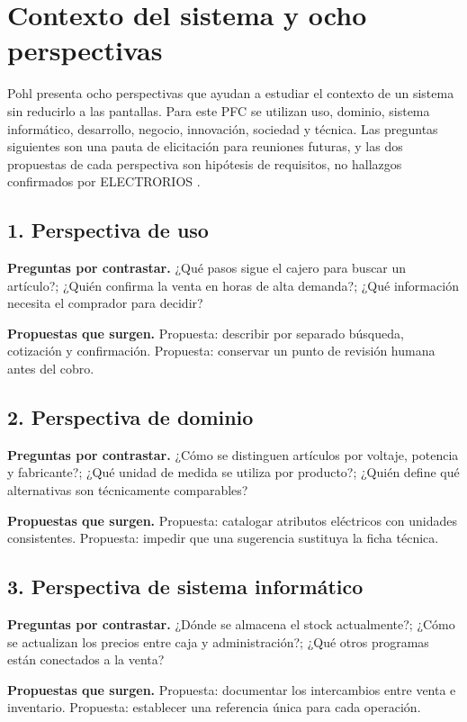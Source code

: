 \section{Contexto del sistema y ocho perspectivas}
Pohl presenta ocho perspectivas que ayudan a estudiar el contexto de un sistema sin reducirlo a las pantallas. Para este PFC se utilizan uso, dominio, sistema informático, desarrollo, negocio, innovación, sociedad y técnica. Las preguntas siguientes son una pauta de elicitación para reuniones futuras, y las dos propuestas de cada perspectiva son hipótesis de requisitos, no hallazgos confirmados por ELECTRORIOS \cite{pohl2025,pohlPerspectivas2025}.
\subsection{1. Perspectiva de uso}
\noindent\textbf{Preguntas por contrastar.} ¿Qué pasos sigue el cajero para buscar un artículo?; ¿Quién confirma la venta en horas de alta demanda?; ¿Qué información necesita el comprador para decidir?\par
\noindent\textbf{Propuestas que surgen.} Propuesta: describir por separado búsqueda, cotización y confirmación. Propuesta: conservar un punto de revisión humana antes del cobro.\par
\subsection{2. Perspectiva de dominio}
\noindent\textbf{Preguntas por contrastar.} ¿Cómo se distinguen artículos por voltaje, potencia y fabricante?; ¿Qué unidad de medida se utiliza por producto?; ¿Quién define qué alternativas son técnicamente comparables?\par
\noindent\textbf{Propuestas que surgen.} Propuesta: catalogar atributos eléctricos con unidades consistentes. Propuesta: impedir que una sugerencia sustituya la ficha técnica.\par
\subsection{3. Perspectiva de sistema informático}
\noindent\textbf{Preguntas por contrastar.} ¿Dónde se almacena el stock actualmente?; ¿Cómo se actualizan los precios entre caja y administración?; ¿Qué otros programas están conectados a la venta?\par
\noindent\textbf{Propuestas que surgen.} Propuesta: documentar los intercambios entre venta e inventario. Propuesta: establecer una referencia única para cada operación.\par
